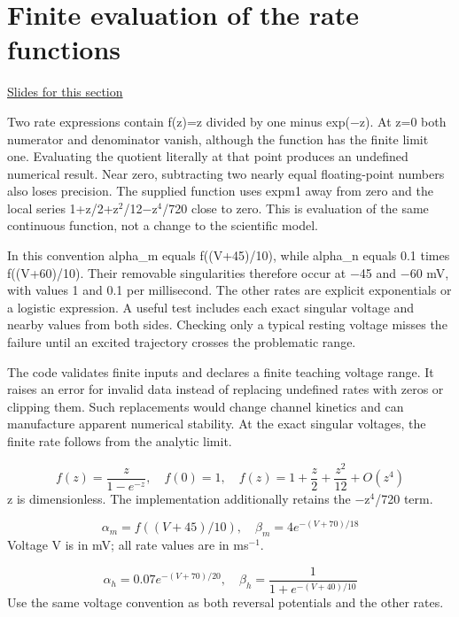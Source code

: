 \documentclass[11pt,letterpaper]{article}
\theoremstyle{definition}\newtheorem{definition}{Definition}\newtheorem{example}{Example}
\numberwithin{equation}{section}
\begin{document}
\section{Finite evaluation of the rate functions}
\hypertarget{note-finite-evaluation-of-the-rate-functions}{}\label{note:finite-evaluation-of-the-rate-functions}
{\small \href{slides.html\#frame=the-removable-rate-singularity\&step=1}{Slides for this section}}\par
Two rate expressions contain f(z)=z divided by one minus exp(\ensuremath{-}z). At z=0 both numerator and denominator vanish, although the function has the finite limit one. Evaluating the quotient literally at that point produces an undefined numerical result. Near zero, subtracting two nearly equal floating-point numbers also loses precision. The supplied function uses expm1 away from zero and the local series 1+z/2+z\ensuremath{^{2}}/12\ensuremath{-}z\ensuremath{^{4}}/720 close to zero. This is evaluation of the same continuous function, not a change to the scientific model.

In this convention alpha\_m equals f((V+45)/10), while alpha\_n equals 0.1 times f((V+60)/10). Their removable singularities therefore occur at \ensuremath{-}45 and \ensuremath{-}60 mV, with values 1 and 0.1 per millisecond. The other rates are explicit exponentials or a logistic expression. A useful test includes each exact singular voltage and nearby values from both sides. Checking only a typical resting voltage misses the failure until an excited trajectory crosses the problematic range.

The code validates finite inputs and declares a finite teaching voltage range. It raises an error for invalid data instead of replacing undefined rates with zeros or clipping them. Such replacements would change channel kinetics and can manufacture apparent numerical stability. At the exact singular voltages, the finite rate follows from the analytic limit.

\[
f(z)=\frac{z}{1-e^{-z}},\quad f(0)=1,\quad f(z)=1+\frac z2+\frac{z^2}{12}+O(z^4)
\]
z is dimensionless. The implementation additionally retains the \ensuremath{-}z\ensuremath{^{4}}/720 term.

\[
\alpha_m=f((V+45)/10),\quad\beta_m=4e^{-(V+70)/18}
\]
Voltage V is in mV; all rate values are in ms\ensuremath{^{-1}}.

\[
\alpha_h=0.07e^{-(V+70)/20},\quad\beta_h=\frac{1}{1+e^{-(V+40)/10}}
\]
Use the same voltage convention as both reversal potentials and the other rates.
\end{document}

